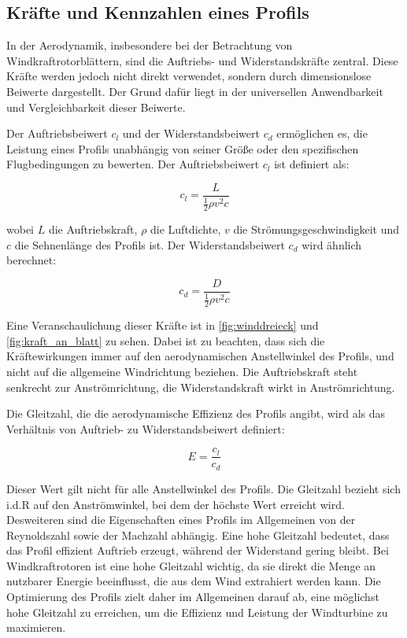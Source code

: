 \subsection{Kräfte und Kennzahlen eines Profils}
\label{sec:forces_profile}


In der Aerodynamik, insbesondere bei der Betrachtung von Windkraftrotorblättern, sind die Auftriebs- und Widerstandskräfte zentral. Diese Kräfte werden jedoch nicht direkt verwendet, sondern durch dimensionslose Beiwerte dargestellt. Der Grund dafür liegt in der universellen Anwendbarkeit und Vergleichbarkeit dieser Beiwerte.

Der Auftriebsbeiwert \( c_l \) und der Widerstandsbeiwert \( c_d \) ermöglichen es, die Leistung eines Profils unabhängig von seiner Größe oder den spezifischen Flugbedingungen zu bewerten. Der Auftriebsbeiwert \( c_l \) ist definiert als:

\begin{equation}
c_l = \frac{L}{\frac{1}{2} \rho v^2 c}
\end{equation}

wobei \( L \) die Auftriebskraft, \( \rho \) die Luftdichte, \( v \) die Strömungsgeschwindigkeit und \( c \) die Sehnenlänge des Profils ist. Der Widerstandsbeiwert \( c_d \) wird ähnlich berechnet:

\begin{equation}
c_d = \frac{D}{\frac{1}{2} \rho v^2 c}
\end{equation}

Eine Veranschaulichung dieser Kräfte ist in \cref{fig:winddreieck} und \cref{fig:kraft_an_blatt} zu sehen. Dabei ist zu beachten, dass sich die Kräftewirkungen immer auf den aerodynamischen Anstellwinkel des Profils, und nicht auf die allgemeine Windrichtung beziehen. Die Auftriebskraft steht senkrecht zur Anströmrichtung, die Widerstandskraft wirkt in Anströmrichtung. 

Die Gleitzahl, die die aerodynamische Effizienz des Profils angibt, wird als das Verhältnis von Auftrieb- zu Widerstandsbeiwert definiert:

\begin{equation}
E = \frac{c_l}{c_d}
\end{equation}

Dieser Wert gilt nicht für alle Anstellwinkel des Profils. Die Gleitzahl bezieht sich i.d.R auf den Anströmwinkel, bei dem der höchste Wert erreicht wird. Desweiteren sind die Eigenschaften eines Profils im Allgemeinen von der Reynoldszahl sowie der Machzahl abhängig.
Eine hohe Gleitzahl bedeutet, dass das Profil effizient Auftrieb erzeugt, während der Widerstand gering bleibt. 
Bei Windkraftrotoren ist eine hohe Gleitzahl wichtig, da sie direkt die Menge an nutzbarer Energie beeinflusst, die aus dem Wind extrahiert werden kann. Die Optimierung des Profils zielt daher im Allgemeinen darauf ab, eine möglichst hohe Gleitzahl zu erreichen, um die Effizienz und Leistung der Windturbine zu maximieren.

